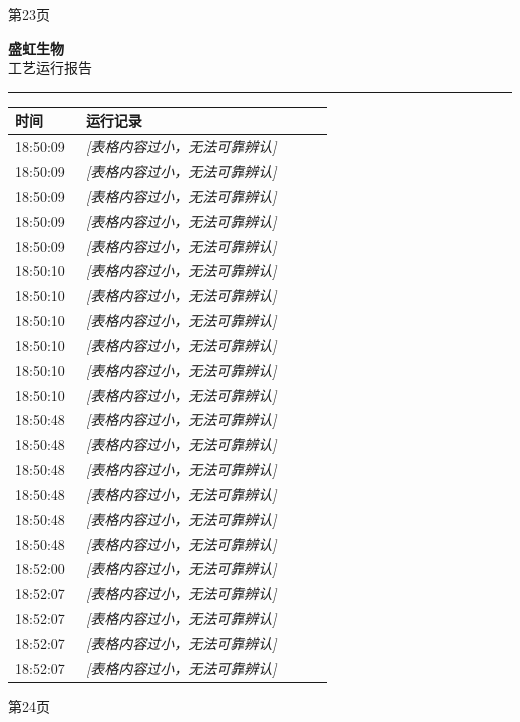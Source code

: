 \documentclass[UTF8,10pt,a4paper,fontset=fandol]{ctexart}
\begin{document}
\begin{center}
\begin{minipage}[t]{0.47\linewidth}
\vspace{2pt}
第23页
\end{minipage}
\hfill
\begin{minipage}[t]{0.47\linewidth}
\centering
\textbf{盛虹生物}\\[2pt]
工艺运行报告\\[-1pt]
\textcolor{yellow}{\rule{\linewidth}{0.6pt}}

\begin{tabular}{|p{0.20\linewidth}|p{0.70\linewidth}|}
\hline
时间 & 运行记录 \\ \hline
18:50:09 & \textit{[表格内容过小，无法可靠辨认]} \\ \hline
18:50:09 & \textit{[表格内容过小，无法可靠辨认]} \\ \hline
18:50:09 & \textit{[表格内容过小，无法可靠辨认]} \\ \hline
18:50:09 & \textit{[表格内容过小，无法可靠辨认]} \\ \hline
18:50:09 & \textit{[表格内容过小，无法可靠辨认]} \\ \hline
18:50:10 & \textit{[表格内容过小，无法可靠辨认]} \\ \hline
18:50:10 & \textit{[表格内容过小，无法可靠辨认]} \\ \hline
18:50:10 & \textit{[表格内容过小，无法可靠辨认]} \\ \hline
18:50:10 & \textit{[表格内容过小，无法可靠辨认]} \\ \hline
18:50:10 & \textit{[表格内容过小，无法可靠辨认]} \\ \hline
18:50:10 & \textit{[表格内容过小，无法可靠辨认]} \\ \hline
18:50:48 & \textit{[表格内容过小，无法可靠辨认]} \\ \hline
18:50:48 & \textit{[表格内容过小，无法可靠辨认]} \\ \hline
18:50:48 & \textit{[表格内容过小，无法可靠辨认]} \\ \hline
18:50:48 & \textit{[表格内容过小，无法可靠辨认]} \\ \hline
18:50:48 & \textit{[表格内容过小，无法可靠辨认]} \\ \hline
18:50:48 & \textit{[表格内容过小，无法可靠辨认]} \\ \hline
18:52:00 & \textit{[表格内容过小，无法可靠辨认]} \\ \hline
18:52:07 & \textit{[表格内容过小，无法可靠辨认]} \\ \hline
18:52:07 & \textit{[表格内容过小，无法可靠辨认]} \\ \hline
18:52:07 & \textit{[表格内容过小，无法可靠辨认]} \\ \hline
18:52:07 & \textit{[表格内容过小，无法可靠辨认]} \\ \hline
\end{tabular}

\vspace{2pt}
第24页
\end{minipage}
\end{center}
\end{document}
